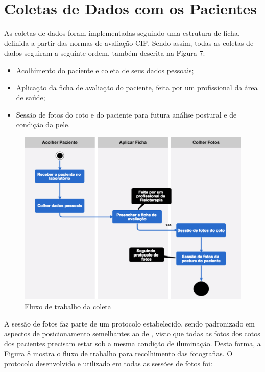 \section{Coletas de Dados com os Pacientes}

    As coletas de dados foram implementadas seguindo uma estrutura de ficha, definida a partir das normas de avaliação CIF. Sendo assim, todas as coletas de dados seguiram a seguinte ordem, também descrita na Figura 7:

    \begin{itemize}
        \item Acolhimento do paciente e coleta de seus dados pessoais;
        \item Aplicação da ficha de avaliação do paciente, feita por um profissional da área de saúde;
        \item Sessão de fotos do coto e do paciente para futura análise postural e de condição da pele.
    \end{itemize}

    \begin{figure}[ht]
        \centering
        \label{fig07}
            \includegraphics[keepaspectratio=true, scale=0.4]{editaveis/images/colet_flow.eps}
        \caption{Fluxo de trabalho da coleta}
    \end{figure}

    A sessão de fotos faz parte de um protocolo estabelecido, sendo padronizado em aspectos de posicionamento semelhantes ao de \cite{Barauna2006}, visto que todas as fotos dos cotos dos pacientes precisam estar sob a mesma condição de iluminação. Desta forma, a Figura 8 mostra o fluxo de trabalho para recolhimento das fotografias. O protocolo desenvolvido e utilizado em todas as sessões de fotos foi:

